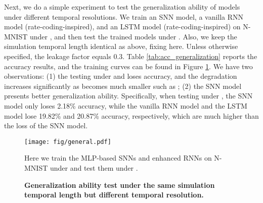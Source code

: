 \documentclass[journal,10pt,twocolumn]{IEEETran}
\begin{document}
\begin{table}[!htbp]
\caption{Accuracy results of generalization test under the same simulation temporal length but different temporal resolution.}
\label{tab:acc_generalization}
\vspace{2pt}
\centering
\renewcommand\arraystretch{1.3}
\end{table}


Next, we do a simple experiment to test the generalization ability of models under different temporal resolutions. We train an SNN model, a vanilla RNN model (rate-coding-inspired), and an LSTM model (rate-coding-inspired) on N-MNIST under , and then test the trained models under . Also, we keep the simulation temporal length identical as above, fixing  here. Unless otherwise specified, the leakage factor equals 0.3. Table \ref{tab:acc_generalization} reports the accuracy results, and the training curves can be found in Figure \ref{fig:generalization}. We have two observations: (1) the testing under  and  loses accuracy, and the degradation increases significantly as  becomes much smaller such as ; (2) the SNN model presents better generalization ability. Specifically, when testing under , the SNN model only loses 2.18\% accuracy, while the vanilla RNN model and the LSTM model lose 19.82\% and 20.87\% accuracy, respectively, which are much higher than the loss of the SNN model.

\begin{figure}[!htbp]
\centering     
\texttt{[image: fig/general.pdf]}
\caption{\textbf{Generalization ability test under the same simulation temporal length but different temporal resolution.}} Here we train the MLP-based SNNs and enhanced RNNs on N-MNIST under  and test them under . \label{fig:generalization} 
\end{figure}
\end{document}
